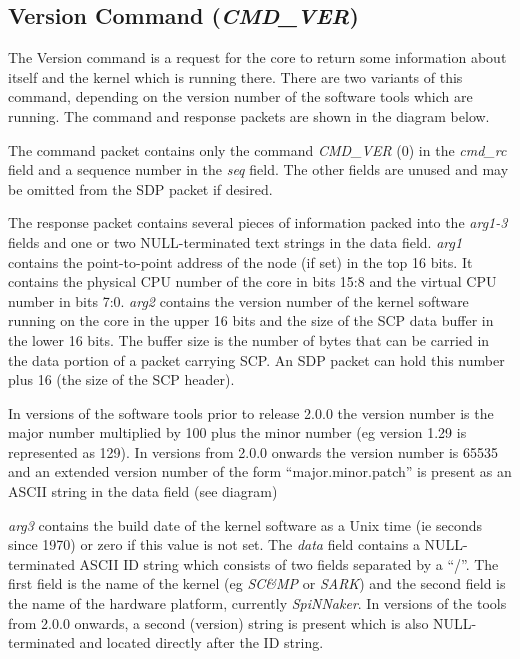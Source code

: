 \subsection{Version Command ({\em CMD\_VER})}

The Version command is a request for the core to return some
information about itself and the kernel which is running there. There
are two variants of this command, depending on the version number of
the software tools which are running.  The command and response
packets are shown in the diagram below.

The command packet contains only the command {\em CMD\_VER} (0) in the
{\em cmd\_rc} field and a sequence number in the {\em seq} field. The
other fields are unused and may be omitted from the SDP packet if
desired.


The response packet contains several pieces of information packed into
the {\em arg1-3} fields and one or two NULL-terminated text strings in
the data field. {\em arg1} contains the point-to-point address of the
node (if set) in the top 16 bits. It contains the physical CPU number
of the core in bits 15:8 and the virtual CPU number in bits 7:0. {\em
arg2} contains the version number of the kernel software running on
the core in the upper 16 bits and the size of the SCP data buffer in
the lower 16 bits.  The buffer size is the number of bytes that can be
carried in the data portion of a packet carrying SCP. An SDP packet
can hold this number plus 16 (the size of the SCP header).

In versions of the software tools prior to release 2.0.0 the version
number is the major number multiplied by 100 plus the minor number (eg
version 1.29 is represented as 129). In versions from 2.0.0 onwards
the version number is 65535 and an extended version number of the
form ``major.minor.patch'' is present as an ASCII string in the data
field (see diagram)

{\em arg3} contains the build date of the kernel software as a Unix
time (ie seconds since 1970) or zero if this value is not set. The
{\em data} field contains a NULL-terminated ASCII ID string which
consists of two fields separated by a ``/''. The first field is the
name of the kernel (eg {\em SC\&MP} or {\em SARK}) and the second
field is the name of the hardware platform, currently {\em
SpiNNaker}. In versions of the tools from 2.0.0 onwards, a second
(version) string is present which is also NULL-terminated and located
directly after the ID string.

